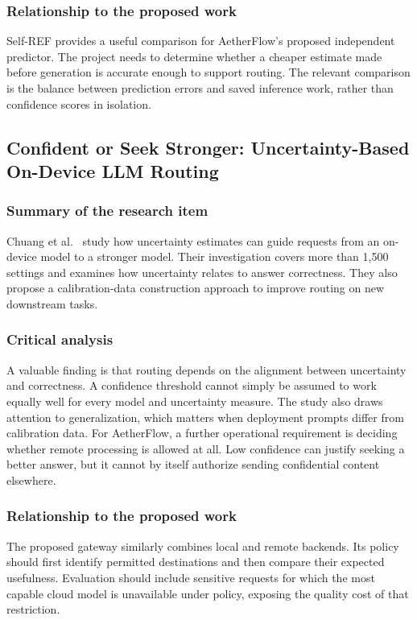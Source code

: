 \subsubsection{Relationship to the proposed work}
Self-REF provides a useful comparison for AetherFlow's proposed independent predictor. The project needs to determine whether a cheaper estimate made before generation is accurate enough to support routing. The relevant comparison is the balance between prediction errors and saved inference work, rather than confidence scores in isolation.

\subsection{Confident or Seek Stronger: Uncertainty-Based On-Device LLM Routing}
\subsubsection{Summary of the research item}
Chuang et al.\ \cite{ref:ConfidentOrSeekStronger} study how uncertainty estimates can guide requests from an on-device model to a stronger model. Their investigation covers more than 1,500 settings and examines how uncertainty relates to answer correctness. They also propose a calibration-data construction approach to improve routing on new downstream tasks.

\subsubsection{Critical analysis}
A valuable finding is that routing depends on the alignment between uncertainty and correctness. A confidence threshold cannot simply be assumed to work equally well for every model and uncertainty measure. The study also draws attention to generalization, which matters when deployment prompts differ from calibration data. For AetherFlow, a further operational requirement is deciding whether remote processing is allowed at all. Low confidence can justify seeking a better answer, but it cannot by itself authorize sending confidential content elsewhere.

\subsubsection{Relationship to the proposed work}
The proposed gateway similarly combines local and remote backends. Its policy should first identify permitted destinations and then compare their expected usefulness. Evaluation should include sensitive requests for which the most capable cloud model is unavailable under policy, exposing the quality cost of that restriction.

